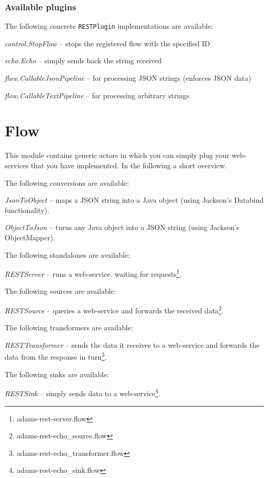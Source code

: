 \documentclass[a4paper]{book}
\begin{document}
\subsection{Available plugins}
The following concrete \verb|RESTPlugin| implementations are available:
\begin{tight_itemize}
  \item \textit{control.StopFlow} -- stops the registered flow with the specified ID
  \item \textit{echo.Echo} -- simply sends back the string received
  \item \textit{flow.CallableJsonPipeline} -- for processing JSON strings (enforces JSON data)
  \item \textit{flow.CallableTextPipeline} -- for processing arbitrary strings
\end{tight_itemize}


\chapter{Flow}
This module contains generic actors in which you can simply plug your 
web-services that you have implemented. In the following a short overview.

The following conversions are available:
\begin{tight_itemize}
	\item \textit{JsonToObject} -- maps a JSON string into a Java object
	(using Jackson's Databind functionality\cite{jackson}).
	\item \textit{ObjectToJson} -- turns any Java object into a JSON string
	(using Jackson's ObjectMapper\cite{jackson}).
\end{tight_itemize}
The following standalones are available:
\begin{tight_itemize}
	\item \textit{RESTServer} -- runs a web-service. waiting for
	requests\footnote{adams-rest-server.flow}.
\end{tight_itemize}
The following sources are available:
\begin{tight_itemize}
	\item \textit{RESTSource} -- queries a web-service and forwards the received
	data\footnote{adams-rest-echo\_source.flow}.
\end{tight_itemize}
The following transformers are available:
\begin{tight_itemize}
	\item \textit{RESTTransformer} -- sends the data it receives to a web-service
	and forwards the data from the response in
	turn\footnote{adams-rest-echo\_transformer.flow}.
\end{tight_itemize}
The following sinks are available:
\begin{tight_itemize}
	\item \textit{RESTSink} -- simply sends data to a web-service\footnote{adams-rest-echo\_sink.flow}.
\end{tight_itemize}
\end{document}
